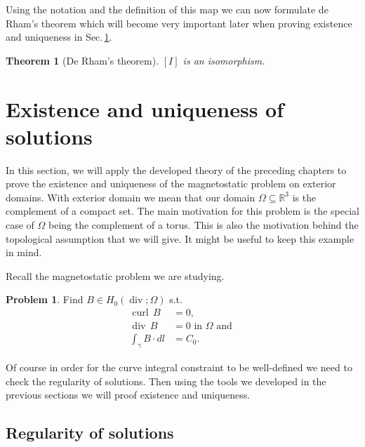 \documentclass[12pt,a4paper]{article}
\numberwithin{equation}{subsection}
\numberwithin{lemma}{subsection}
\newtheorem{theorem}[lemma]{Theorem}
\theoremstyle{definition}
\newtheorem{problem}[lemma]{Problem}
\DeclareMathOperator{\curl}{curl}
\DeclareMathOperator{\diver}{div}
\newcommand{\real}{\mathbb{R}}
\begin{document}
Using the notation and the definition of this map we can now formulate 
de Rham's theorem which will become very important later when proving
existence and uniqueness in Sec.\,\ref{sec:existence_and_uniqueness}.
\begin{theorem}[De Rham's theorem]
    $[I]$ is an isomorphism.
\end{theorem}


\section{Existence and uniqueness of solutions}\label{sec:existence_and_uniqueness}

In this section, we will apply the developed theory of the preceding chapters
to prove the existence and uniqueness of the magnetostatic problem 
on exterior domains. With exterior domain we mean that our domain $\Omega \subseteq \real^3$
is the complement of a compact set. The main motivation for this problem is 
the special case of $\Omega$ being the complement of a torus. 
This is also the motivation behind the
topological assumption that we will give. It might be useful to keep this
example in mind.

Recall the magnetostatic problem we are studying.

\begin{problem}\label{prob:magnetostatic_problem}
    Find $B \in H_0(\diver;\Omega)$ s.t.
    \begin{align}
        \curl \, B &= 0, \\ 
        \diver \, B  &= 0 \text{ in } \Omega \text{ and }\\
        \int_\gamma B \cdot dl &= C_0.
    \end{align}
\end{problem}

Of course in order for the curve integral constraint to be well-defined 
we need to check the regularity of solutions. Then using the tools we developed
in the previous sections we will proof existence and uniqueness.

\subsection{Regularity of solutions}\label{sec:regularity_of_solutions}
\end{document}
